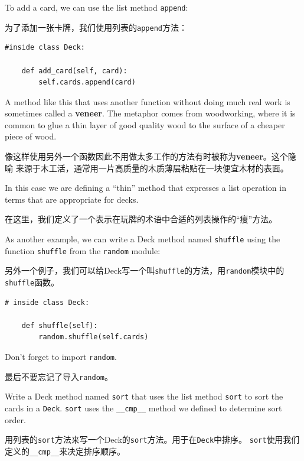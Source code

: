 \documentclass[10pt]{book}
\begin{document}
\begin{CJK}{UTF8}{gbsn}
To add a card, we can use the list method {\tt append}:

为了添加一张卡牌，我们使用列表的{\tt append}方法：

\begin{verbatim}
#inside class Deck:

    def add_card(self, card):
        self.cards.append(card)
\end{verbatim}
%
A method like this that uses another function without doing
much real work is sometimes called a {\bf veneer}.  The metaphor
comes from woodworking, where it is common to glue a thin
layer of good quality wood to the surface of a cheaper piece of
wood.

像这样使用另外一个函数因此不用做太多工作的方法有时被称为{\bf veneer}。这个隐喻
来源于木工活，通常用一片高质量的木质薄层粘贴在一块便宜木材的表面。

In this case we are defining a ``thin'' method that expresses
a list operation in terms that are appropriate for decks.

在这里，我们定义了一个表示在玩牌的术语中合适的列表操作的``瘦''方法。

As another example, we can write a Deck method named {\tt shuffle}
using the function {\tt shuffle} from the {\tt random} module:

另外一个例子，我们可以给Deck写一个叫{\tt shuffle}的方法，用{\tt random}模块中的
{\tt shuffle}函数。

\begin{verbatim}
# inside class Deck:
            
    def shuffle(self):
        random.shuffle(self.cards)
\end{verbatim}
%
Don't forget to import {\tt random}.

最后不要忘记了导入{\tt random}。

\begin{exercise}

Write a Deck method named {\tt sort} that uses the list method
{\tt sort} to sort the cards in a {\tt Deck}.  {\tt sort} uses
the \verb"__cmp__" method we defined to determine sort order.
\end{exercise}

用列表的{\tt sort}方法来写一个Deck的{\tt sort}方法。用于在{\tt Deck}中排序。
{\tt sort}使用我们定义的\verb"__cmp__"来决定排序顺序。




\end{CJK}
\end{document}
